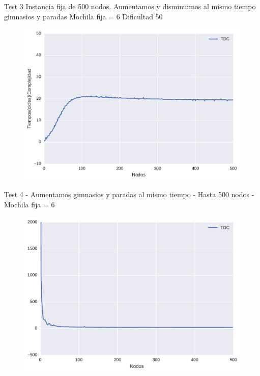 Test 3
Instancia fija de 500 nodos.
Aumentamos y disminuimos al mismo tiempo gimnasios y paradas
Mochila fija = 6
Dificultad 50

\begin{figure}[H]
  \begin{center}
    \includegraphics[scale=0.4]{imagenes/ej2test3iempos.pdf}
    \caption{}
    \label{}
  \end{center}
\end{figure}


Test 4 - 
Aumentamos gimnasios y paradas al mismo tiempo - 
Hasta 500 nodos - 
Mochila fija = 6


\begin{figure}[H]
  \begin{center}
    \includegraphics[scale=0.4]{imagenes/ej2test4iempos.pdf}
    \caption{}
    \label{}
  \end{center}
\end{figure}


